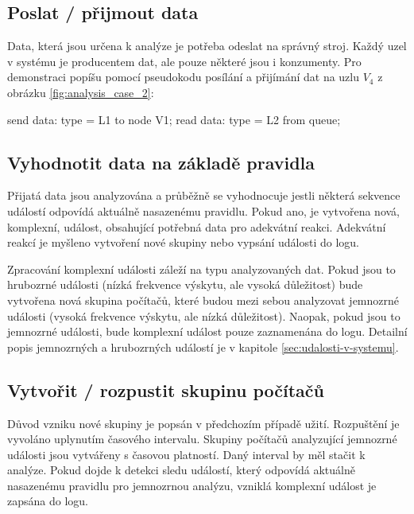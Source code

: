 \documentclass[
  digital, %
  table,   %
  nolof,     %
  nolot,     %
  oneside, %
  nocover,
  monochrome,
  12pt
]{fithesis3}
\begin{document}
\subsection*{Poslat / přijmout data}
Data, která jsou určena k analýze je potřeba odeslat na správný stroj. Každý uzel v systému je producentem dat, ale pouze některé jsou i konzumenty. Pro demonstraci popíšu pomocí pseudokodu posílání a přijímání dat na uzlu \textit{$V_4$} z obrázku \ref{fig:analysis_case_2}:

\begin{center}
\begin{minipage}[H]{.6\linewidth}
	\begin{mylisting}
send data: {type = L1} to node V1;			
read data: {type = L2} from queue;			
	\end{mylisting}
	\label{fig:sec_usecase_rule} 
\end{minipage}
\end{center}

\subsection*{Vyhodnotit data na základě pravidla}
Přijatá data jsou analyzována a průběžně se vyhodnocuje jestli některá sekvence událostí odpovídá aktuálně nasazenému pravidlu. Pokud ano, je vytvořena nová, komplexní, událost, obsahující potřebná data pro adekvátní reakci. Adekvátní reakcí je myšleno vytvoření nové skupiny nebo vypsání události do logu.

Zpracování komplexní události záleží na typu analyzovaných dat. Pokud jsou to hrubozrné události (nízká frekvence výskytu, ale vysoká důležitost) bude vytvořena nová skupina počítačů, které budou mezi sebou analyzovat jemnozrné události (vysoká frekvence výskytu, ale nízká důležitost). Naopak, pokud jsou to jemnozrné události, bude komplexní událost pouze zaznamenána do logu. Detailní popis jemnozrných a hrubozrných událostí je v kapitole \ref{sec:udalosti-v-systemu}.

\subsection*{Vytvořit / rozpustit skupinu počítačů}
Důvod vzniku nové skupiny je popsán v předchozím případě užití. Rozpuštění je vyvoláno uplynutím časového intervalu. Skupiny počítačů analyzující jemnozrné události jsou vytvářeny s časovou platností. Daný interval by měl stačit k analýze. Pokud dojde k detekci sledu událostí, který odpovídá aktuálně nasazenému pravidlu pro jemnozrnou analýzu, vzniklá komplexní událost je zapsána do logu.
\end{document}
